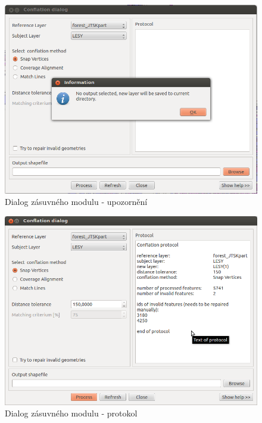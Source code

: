   \begin{figure}[H]
    \centering
      \includegraphics[width=360pt]{./pictures/dialog3.png}
      \caption{Dialog zásuvného modulu - upozornění}
      \label{fig:d3}
  \end{figure} 

  \begin{figure}[H]
    \centering
      \includegraphics[width=360pt]{./pictures/dialog4.png}
      \caption{Dialog zásuvného modulu - protokol}
      \label{fig:d4}
  \end{figure} 

